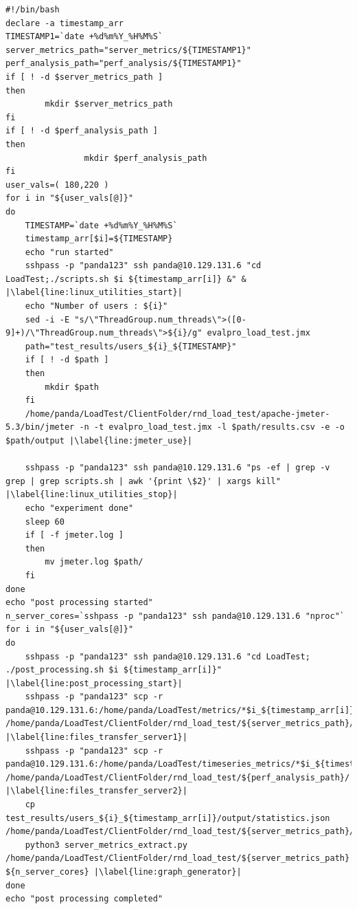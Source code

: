 \documentclass{iitbreport}
\begin{document}
\begin{lstlisting}[escapechar=|]
#!/bin/bash
declare -a timestamp_arr
TIMESTAMP1=`date +%d%m%Y_%H%M%S`
server_metrics_path="server_metrics/${TIMESTAMP1}"
perf_analysis_path="perf_analysis/${TIMESTAMP1}"
if [ ! -d $server_metrics_path ]
then
		mkdir $server_metrics_path
fi
if [ ! -d $perf_analysis_path ]
then
                mkdir $perf_analysis_path
fi
user_vals=( 180,220 )
for i in "${user_vals[@]}"
do
	TIMESTAMP=`date +%d%m%Y_%H%M%S`
	timestamp_arr[$i]=${TIMESTAMP}
	echo "run started"
	sshpass -p "panda123" ssh panda@10.129.131.6 "cd LoadTest;./scripts.sh $i ${timestamp_arr[i]} &" &  |\label{line:linux_utilities_start}|
	echo "Number of users : ${i}"
	sed -i -E "s/\"ThreadGroup.num_threads\">([0-9]+)/\"ThreadGroup.num_threads\">${i}/g" evalpro_load_test.jmx
	path="test_results/users_${i}_${TIMESTAMP}"
	if [ ! -d $path ]
	then
		mkdir $path
	fi
	/home/panda/LoadTest/ClientFolder/rnd_load_test/apache-jmeter-5.3/bin/jmeter -n -t evalpro_load_test.jmx -l $path/results.csv -e -o $path/output |\label{line:jmeter_use}|

	sshpass -p "panda123" ssh panda@10.129.131.6 "ps -ef | grep -v grep | grep scripts.sh | awk '{print \$2}' | xargs kill" |\label{line:linux_utilities_stop}|
    echo "experiment done"
	sleep 60
	if [ -f jmeter.log ]
	then
		mv jmeter.log $path/
	fi
done
echo "post processing started"
n_server_cores=`sshpass -p "panda123" ssh panda@10.129.131.6 "nproc"`
for i in "${user_vals[@]}"
do
	sshpass -p "panda123" ssh panda@10.129.131.6 "cd LoadTest; ./post_processing.sh $i ${timestamp_arr[i]}" |\label{line:post_processing_start}|
	sshpass -p "panda123" scp -r panda@10.129.131.6:/home/panda/LoadTest/metrics/*$i_${timestamp_arr[i]}* /home/panda/LoadTest/ClientFolder/rnd_load_test/${server_metrics_path}/ |\label{line:files_transfer_server1}|
	sshpass -p "panda123" scp -r panda@10.129.131.6:/home/panda/LoadTest/timeseries_metrics/*$i_${timestamp_arr[i]}*/* /home/panda/LoadTest/ClientFolder/rnd_load_test/${perf_analysis_path}/ |\label{line:files_transfer_server2}|
	cp test_results/users_${i}_${timestamp_arr[i]}/output/statistics.json /home/panda/LoadTest/ClientFolder/rnd_load_test/${server_metrics_path}/client_side_values_${i}.json
	python3 server_metrics_extract.py /home/panda/LoadTest/ClientFolder/rnd_load_test/${server_metrics_path} ${n_server_cores} |\label{line:graph_generator}|
done 
echo "post processing completed"
\end{lstlisting}
\end{document}
